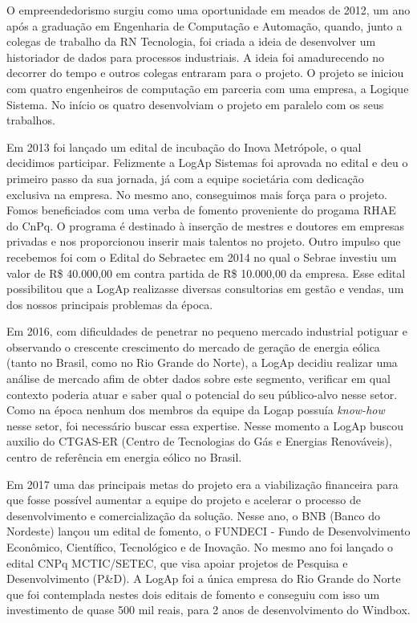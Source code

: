 
\label{Cap:trajetoriaFormacaoCINO}

O empreendedorismo surgiu como uma oportunidade em meados de 2012, um ano após a graduação em Engenharia de Computação e Automação, quando, junto a colegas de trabalho da RN Tecnologia, foi criada a ideia de desenvolver um historiador de dados para processos industriais. A ideia foi amadurecendo no decorrer do tempo e outros colegas entraram para o projeto. O projeto se iniciou com quatro engenheiros de computação em parceria com uma empresa, a Logique Sistema. No início os quatro desenvolviam o projeto em paralelo com os seus trabalhos. 

Em 2013 foi lançado um edital de incubação do Inova Metrópole, o qual decidimos participar. Felizmente a LogAp Sistemas foi aprovada no edital e deu o primeiro passo da sua jornada, já com a equipe societária com dedicação exclusiva na empresa. No mesmo ano, conseguimos mais força para o projeto. Fomos beneficiados com uma verba de fomento proveniente do progama RHAE do CnPq. O programa é destinado à inserção de mestres e doutores em empresas privadas e nos proporcionou inserir mais talentos no projeto. Outro impulso que recebemos foi com o Edital do Sebraetec em 2014 no qual o Sebrae investiu um valor de R\$ 40.000,00 em contra partida de R\$ 10.000,00 da empresa. Esse edital possibilitou que a LogAp realizasse diversas consultorias em gestão e vendas, um dos nossos principais problemas da época.

Em 2016, com dificuldades de penetrar no pequeno mercado industrial potiguar e observando o crescente crescimento do mercado de geração de energia eólica (tanto no Brasil, como no Rio Grande do Norte), a LogAp decidiu realizar uma análise de mercado afim de obter dados sobre este segmento, verificar em qual contexto poderia atuar e saber qual o potencial do seu público-alvo nesse setor. Como na época nenhum dos membros da equipe da Logap possuía \textit{know-how} nesse setor, foi necessário buscar essa expertise. Nesse momento a LogAp buscou auxilio do CTGAS-ER (Centro de Tecnologias do Gás e Energias Renováveis), centro de referência em energia eólico no Brasil. 

Em 2017 uma das principais metas do projeto era a viabilização financeira para que fosse possível aumentar a equipe do projeto e acelerar o processo de desenvolvimento e comercialização da solução. Nesse ano, o BNB (Banco do Nordeste) lançou um edital de fomento, o FUNDECI - Fundo de Desenvolvimento Econômico, Científico, Tecnológico e de Inovação. No mesmo ano foi lançado o edital CNPq MCTIC/SETEC, que visa apoiar projetos de Pesquisa e Desenvolvimento (P\&D). A LogAp foi a única empresa do Rio Grande do Norte que foi contemplada nestes dois editais de fomento e conseguiu com isso um investimento de quase 500 mil reais, para 2 anos de desenvolvimento do Windbox. 

